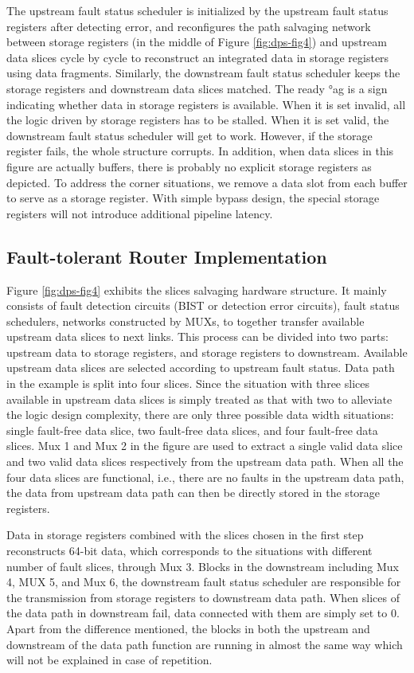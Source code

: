 The upstream fault status scheduler is initialized by the upstream fault status registers after detecting error, and reconfigures the path salvaging network between storage registers (in the middle of Figure \ref{fig:dps-fig4}) and upstream data slices cycle by cycle to reconstruct an integrated data in storage registers using data fragments. Similarly, the downstream fault status scheduler keeps the storage registers and downstream data slices matched. The ready °ag is a sign indicating whether data in storage registers is available. When it is set invalid, all the logic driven by storage registers has to be stalled. When it is set valid, the downstream fault status scheduler will get to work. However, if the storage register fails, the whole structure corrupts. In addition, when data slices in this figure are actually buffers, there is probably no explicit storage registers as depicted. To address the corner situations, we remove a data slot from each buffer to serve as a storage register. With simple bypass design, the special storage registers will not introduce additional pipeline latency. 

\subsection{Fault-tolerant Router Implementation}
Figure \ref{fig:dps-fig4} exhibits the slices salvaging hardware structure. It mainly consists of fault detection circuits (BIST or detection error circuits), fault status schedulers, networks constructed by MUXs, to together transfer available upstream data slices to next links. This process can be divided into two parts: upstream data to storage registers, and storage registers to downstream. Available upstream data slices are selected according to upstream fault status. Data path in the example is split into four slices. Since the situation with three slices available in upstream data slices is simply treated as that with two to alleviate the logic design complexity, there are only three possible data width situations: single fault-free data slice, two fault-free data slices, and four fault-free data slices. Mux 1 and Mux 2 in the figure are used to extract a single valid data slice and two valid data slices respectively from the upstream data path. When all the four data slices are functional, i.e., there are no faults in the upstream data path, the data from upstream data path can then be directly stored in the storage registers. 

Data in storage registers combined with the slices chosen in the first step reconstructs 64-bit data, which corresponds to the situations with different number of fault slices, through Mux 3. Blocks in the downstream including Mux 4, MUX 5, and Mux 6, the downstream fault status scheduler are responsible for the transmission from storage registers to downstream data path. When slices of the data path in downstream fail, data connected with them are simply set to 0. Apart from the difference mentioned, the blocks in both the upstream and downstream of the data path function are running in almost the same way which will not be explained in case of repetition.

